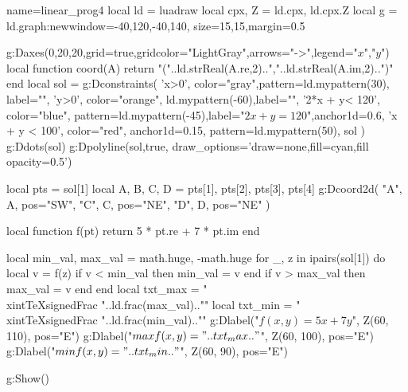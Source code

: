 \begin{luadraw}{name=linear_prog4}
local ld = luadraw
local cpx, Z = ld.cpx, ld.cpx.Z 
local g = ld.graph:new{window={-40,120,-40,140}, size={15,15},margin=0.5}

g:Daxes({0,20,20},{grid=true,gridcolor="LightGray",arrows="->",legend={"$x$","$y$"}})
local function coord(A)
    return "("..ld.strReal(A.re,2)..","..ld.strReal(A.im,2)..")"
end
local sol = {}
g:Dconstraints(
    'x>0', {color="gray",pattern=ld.mypattern(30), label=""},
    'y>0', {color="orange", ld.mypattern(-60),label=""},
    '2*x + y< 120', {color="blue", pattern=ld.mypattern(-45),label="$2x+y=120$",anchor1d=0.6},
    'x + y  < 100', {color="red", anchor1d=0.15, pattern=ld.mypattern(50)},
    sol
)
g:Ddots(sol) 
g:Dpolyline(sol,true, {draw_options='draw=none,fill=cyan,fill opacity=0.5'})

local pts = sol[1] 
local A, B, C, D = pts[1], pts[2], pts[3], pts[4]
g:Dcoord2d(
    "A", A, {pos="SW"},
    "C", C, {pos="NE"},
    "D", D, {pos="NE"}
)

local function f(pt)
    return 5 * pt.re + 7 * pt.im
end

local min_val, max_val = math.huge, -math.huge
for _, z in ipairs(sol[1]) do
    local v = f(z)
    if v < min_val then min_val = v end
    if v > max_val then max_val = v end
end
local txt_max = "\\xintTeXsignedFrac {"..ld.frac(max_val).."}"
local txt_min = "\\xintTeXsignedFrac {"..ld.frac(min_val).."}"
g:Dlabel("$f(x,y) = 5x + 7y$", Z(60, 110), {pos="E"})
g:Dlabel("$\\max f(x,y) = " .. txt_max .. "$", Z(60, 100), {pos="E"})
g:Dlabel("$\\min f(x,y) = " .. txt_min .. "$", Z(60, 90), {pos="E"})

g:Show()
\end{luadraw}
